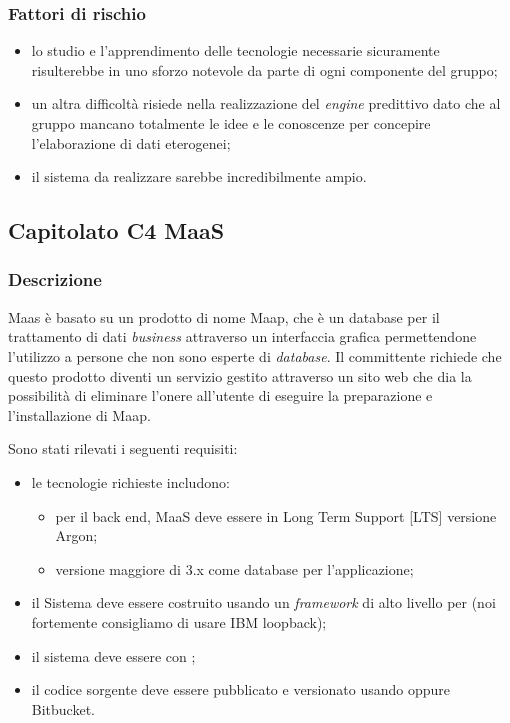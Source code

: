 \documentclass[12pt,a4paper]{article}
\begin{document}
\subsubsection{Fattori di rischio}

\begin{itemize}
\item lo studio e l'apprendimento delle tecnologie necessarie sicuramente risulterebbe in uno sforzo notevole da parte di ogni componente del gruppo;
\item un altra difficoltà risiede nella realizzazione del \textit{engine} predittivo dato che al gruppo mancano totalmente le idee e le conoscenze per concepire l'elaborazione di dati eterogenei;
\item il sistema da realizzare sarebbe incredibilmente ampio.
\end{itemize}

\newpage
\subsection{Capitolato C4 MaaS}
\subsubsection{Descrizione}
Maas è basato su un prodotto di nome Maap, che è un database  per il trattamento di dati \textit{business} attraverso un interfaccia grafica permettendone l'utilizzo a persone che non sono esperte di \textit{database}. Il committente richiede che questo prodotto diventi un servizio gestito attraverso un sito web che dia la possibilità di eliminare l'onere all'utente di eseguire la preparazione e l'installazione di Maap.

Sono stati rilevati i seguenti requisiti:

\begin{itemize}

\item le tecnologie richieste includono:

\begin{itemize}
\item {} per il back end, MaaS deve essere in Long Term Support [LTS] versione Argon;
\item {} versione maggiore di 3.x come database per l'applicazione; 
\end{itemize}

\item il Sistema deve essere costruito usando un \textit{framework} di alto livello per  (noi fortemente consigliamo di usare IBM loopback);

\item il sistema deve essere  con ;
 
\item il codice sorgente deve essere pubblicato e versionato usando  oppure Bitbucket. 

\end{itemize}
\end{document}
